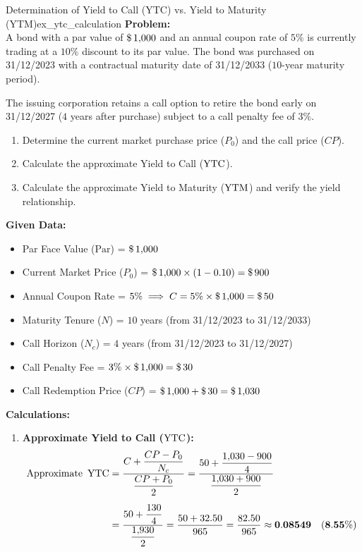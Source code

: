 \begin{example}{Determination of Yield to Call (YTC) vs. Yield to Maturity (YTM)}{ex_ytc_calculation}
\textbf{Problem:} \\
A bond with a par value of $\text{\$}\, 1{,}000$ and an annual coupon rate of $5\%$ is currently trading at a $10\%$ discount to its par value. The bond was purchased on 31/12/2023 with a contractual maturity date of 31/12/2033 ($10$-year maturity period).

The issuing corporation retains a call option to retire the bond early on 31/12/2027 ($4$ years after purchase) subject to a call penalty fee of $3\%$.
\begin{enumerate}[label=(\alph*), noitemsep]
    \item Determine the current market purchase price ($P_0$) and the call price ($CP$).
    \item Calculate the approximate Yield to Call ($\operatorname{YTC}$).
    \item Calculate the approximate Yield to Maturity ($\operatorname{YTM}$) and verify the yield relationship.
\end{enumerate}

\tcbline
\textbf{Given Data:}
\begin{itemize}[noitemsep]
    \item Par Face Value ($\text{Par}$) = $\text{\$}\, 1{,}000$
    \item Current Market Price ($P_0$) = $\text{\$}\, 1{,}000 \times (1 - 0.10) = \text{\$}\, 900$
    \item Annual Coupon Rate = $5\% \implies C = 5\% \times \text{\$}\, 1{,}000 = \text{\$}\, 50$
    \item Maturity Tenure ($N$) = $10$ years (from 31/12/2023 to 31/12/2033)
    \item Call Horizon ($N_c$) = $4$ years (from 31/12/2023 to 31/12/2027)
    \item Call Penalty Fee = $3\% \times \text{\$}\, 1{,}000 = \text{\$}\, 30$
    \item Call Redemption Price ($CP$) = $\text{\$}\, 1{,}000 + \text{\$}\, 30 = \text{\$}\, 1{,}030$
\end{itemize}

\textbf{Calculations:}
\begin{enumerate}[leftmargin=*]
    \item \textbf{Approximate Yield to Call ($\operatorname{YTC}$):}
    \begin{align*}
        \text{Approximate } \operatorname{YTC} &= \frac{C + \dfrac{CP - P_0}{N_c}}{\dfrac{CP + P_0}{2}} = \frac{50 + \dfrac{1{,}030 - 900}{4}}{\dfrac{1{,}030 + 900}{2}} \\[0.5em]
        &= \frac{50 + \dfrac{130}{4}}{\dfrac{1{,}930}{2}} = \frac{50 + 32.50}{965} = \frac{82.50}{965} \approx \mathbf{0.08549} \quad (\mathbf{8.55\%})
    \end{align*}


\end{enumerate}
\end{example}
